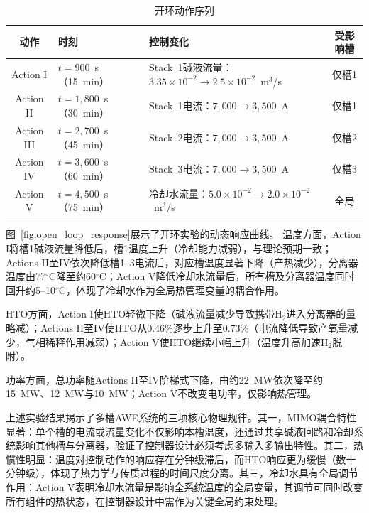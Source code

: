 \begin{table}[!htbp]
  \centering
  \caption{开环动作序列}
  \label{tab:open_loop_actions}
  \begin{tabular}{cp{3.2cm}p{6.5cm}c}
    \toprule
    动作 & 时刻 & 控制变化 & 受影响槽 \\
    \midrule
    Action I & $t=900$~s（15~min） & Stack~1碱液流量：$3.35\times10^{-2}\to2.5\times10^{-2}$~m$^3$/s & 仅槽1 \\
    Action II & $t=1,800$~s（30~min） & Stack~1电流：$7,000\to3,500$~A & 仅槽1 \\
    Action III & $t=2,700$~s（45~min） & Stack~2电流：$7,000\to3,500$~A & 仅槽2 \\
    Action IV & $t=3,600$~s（60~min） & Stack~3电流：$7,000\to3,500$~A & 仅槽3 \\
    Action V & $t=4,500$~s（75~min） & 冷却水流量：$5.0\times10^{-2}\to2.0\times10^{-2}$~m$^3$/s & 全局 \\
    \bottomrule
  \end{tabular}
\end{table}

图~\ref{fig:open_loop_response}展示了开环实验的动态响应曲线。
温度方面，Action I将槽1碱液流量降低后，槽1温度上升（冷却能力减弱），与理论预期一致；Actions II至IV依次降低槽1--3电流后，对应槽温度显著下降（产热减少），分离器温度由77$^\circ$C降至约60$^\circ$C；Action V降低冷却水流量后，所有槽及分离器温度同时回升约5--10$^\circ$C，体现了冷却水作为全局热管理变量的耦合作用。

HTO方面，Action I使HTO轻微下降（碱液流量减少导致携带H$_2$进入分离器的量略减）；Actions II至IV使HTO从0.46\%逐步上升至0.73\%（电流降低导致产氧量减少，气相稀释作用减弱）；Action V使HTO继续小幅上升（温度升高加速H$_2$脱附）。

功率方面，总功率随Actions II至IV阶梯式下降，由约22~MW依次降至约15~MW、12~MW与10~MW；Action V不改变电功率，仅影响热管理。

上述实验结果揭示了多槽AWE系统的三项核心物理规律。其一，MIMO耦合特性显著：单个槽的电流或流量变化不仅影响本槽温度，还通过共享碱液回路和冷却系统影响其他槽与分离器，验证了控制器设计必须考虑多输入多输出特性。其二，热惯性明显：温度对控制动作的响应存在分钟级滞后，而HTO响应更为缓慢（数十分钟级），体现了热力学与传质过程的时间尺度分离。其三，冷却水具有全局调节作用：Action V表明冷却水流量是影响全系统温度的全局变量，其调节可同时改变所有组件的热状态，在控制器设计中需作为关键全局约束处理。

